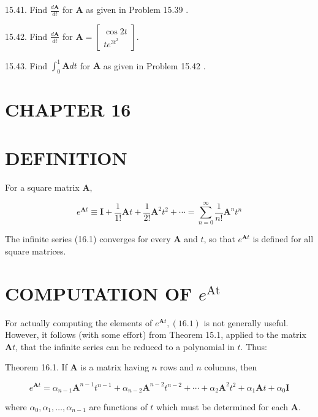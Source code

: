 \documentclass[10pt]{article}
\begin{document}
15.41. Find $\frac{d \mathbf{A}}{d t}$ for $\mathbf{A}$ as given in Problem 15.39 .

15.42. Find $\frac{d \mathbf{A}}{d t}$ for $\mathbf{A}=\left[\begin{array}{c}\cos 2 t \\ t e^{3 t^{2}}\end{array}\right]$.

15.43. Find $\int_{0}^{1} \mathbf{A} d t$ for $\mathbf{A}$ as given in Problem 15.42 .

\section*{CHAPTER 16}
\section*{DEFINITION}
For a square matrix $\mathbf{A}$,


\begin{equation*}
e^{\mathbf{A} t} \equiv \mathbf{I}+\frac{1}{1 !} \mathbf{A} t+\frac{1}{2 !} \mathbf{A}^{2} t^{2}+\cdots=\sum_{n=0}^{\infty} \frac{1}{n !} \mathbf{A}^{n} t^{n} \tag{16.1}
\end{equation*}


The infinite series (16.1) converges for every $\mathbf{A}$ and $t$, so that $e^{\mathbf{A} t}$ is defined for all square matrices.

\section*{COMPUTATION OF $e^{\text {At }}$}
For actually computing the elements of $e^{\mathbf{A} t},(16.1)$ is not generally useful. However, it follows (with some effort) from Theorem 15.1, applied to the matrix $\mathbf{A} t$, that the infinite series can be reduced to a polynomial in $t$. Thus:

Theorem 16.1. If $\mathbf{A}$ is a matrix having $n$ rows and $n$ columns, then


\begin{equation*}
e^{\mathbf{A} t}=\alpha_{n-1} \mathbf{A}^{n-1} t^{n-1}+\alpha_{n-2} \mathbf{A}^{n-2} t^{n-2}+\cdots+\alpha_{2} \mathbf{A}^{2} t^{2}+\alpha_{1} \mathbf{A} t+\alpha_{0} \mathbf{I} \tag{16.2}
\end{equation*}


where $\alpha_{0}, \alpha_{1}, \ldots, \alpha_{n-1}$ are functions of $t$ which must be determined for each $\mathbf{A}$.
\end{document}

